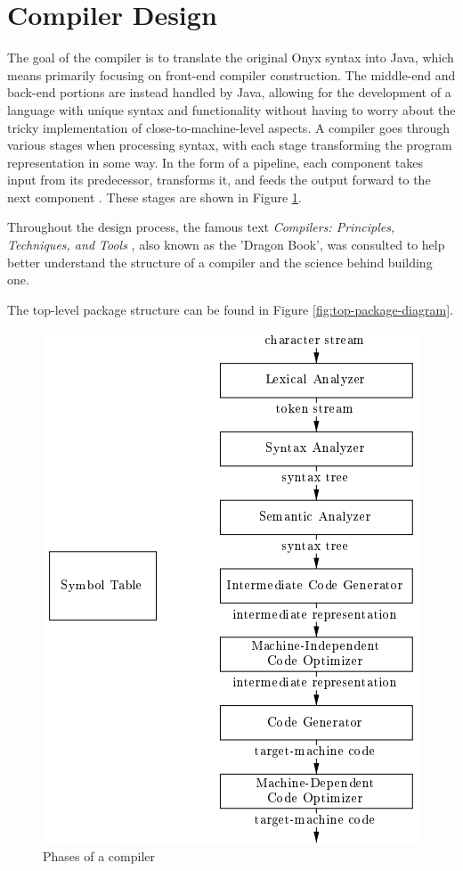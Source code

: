 \documentclass[
]{report}
\begin{document}
\section{Compiler Design}
The goal of the compiler is to translate the original Onyx syntax into
Java, which means primarily focusing on front-end compiler construction.
The middle-end and back-end portions are instead handled by Java,
allowing for the development of a language with unique syntax and
functionality without having to worry about the tricky implementation of
close-to-machine-level aspects. A compiler goes through various stages
when processing syntax, with each stage transforming the program
representation in some way. In the form of a pipeline, each component
takes input from its predecessor, transforms it, and feeds the output
forward to the next component \cite{guru99-website}. These stages are
shown in Figure \ref{fig:compiler-phases}.

Throughout the design process, the famous text \emph{Compilers: Principles, Techniques, and Tools} \cite{dragon-book},
also known as the 'Dragon Book', was consulted to help better understand 
the structure of a compiler and the science behind building one.

The top-level package structure can be found in Figure \ref{fig:top-package-diagram}.

\begin{figure}
	\centering
	\includegraphics[width=\textwidth]{compiler-phases}
	\caption{Phases of a compiler \cite{dragon-book}}
	\label{fig:compiler-phases}
\end{figure}
\newpage
\end{document}
